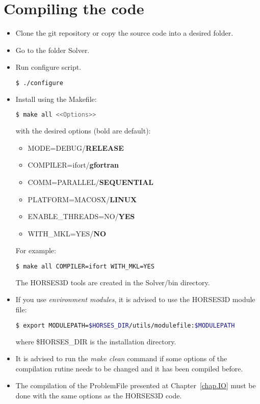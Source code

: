 \documentclass[a4paper,10pt]{report}
\begin{document}
\chapter{Compiling the code}

\begin{itemize}
\item Clone the git repository or copy the source code into a desired folder.

\item Go to the folder Solver.

\item Run configure script.
\begin{lstlisting}[language=bash]
	$ ./configure
\end{lstlisting}
\item Install using the Makefile:
\begin{lstlisting}[language=bash]
	$ make all <<Options>>
\end{lstlisting}
with the desired options (bold are default):

\begin{itemize}
\item MODE=DEBUG/\textbf{RELEASE}
\item COMPILER=ifort/\textbf{gfortran}
\item COMM=PARALLEL/\textbf{SEQUENTIAL}
\item PLATFORM=MACOSX/\textbf{LINUX}
\item ENABLE\_THREADS=NO/\textbf{YES}
\item WITH\_MKL=YES/\textbf{NO}
\end{itemize}

For example:
\begin{lstlisting}[language=bash]
	$ make all COMPILER=ifort WITH_MKL=YES
\end{lstlisting}

The HORSES3D tools are created in the Solver/bin directory.

\item If you use \textit{environment modules}, it is advised to use the HORSES3D module file:\\
\begin{lstlisting}[language=bash]
	$ export MODULEPATH=$HORSES_DIR/utils/modulefile:$MODULEPATH
\end{lstlisting}
where \$HORSES\_DIR is the installation directory.

\item It is advised to run the \emph{make clean} command if some options of the compilation rutine needs to be changed and it has been compiled before.

\item The compilation of the ProblemFile presented at Chapter~\ref{chap.IO} must be done with the same options as the HORSES3D code.
\end{itemize}
\end{document}
